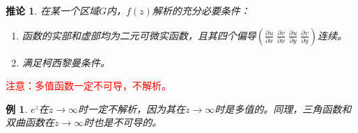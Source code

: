 \documentclass[10pt, a4paper, oneside]{ctexbook}
\newtheorem{corollary}[theorem]{推论}
\newtheorem{example}[theorem]{例}
\newcommand{\partdev}[3][]
{\ensuremath{\frac{\displaystyle \partial^{#1} #2}{ \displaystyle \partial #3}}}
\begin{document}
\begin{corollary}
    在某一个区域$G$内，$f(z)$解析的充分必要条件：
    \begin{enumerate}
        \item 函数的实部和虚部均为二元可微实函数，且其四个偏导$\left(\displaystyle \partdev{u}{x} \; \partdev{v}{x} \; \partdev{u}{y} \; \partdev{v}{y} \right)$连续。
        \item 满足柯西黎曼条件。
    \end{enumerate}
\end{corollary}
\textcolor{red}{注意：多值函数一定不可导，不解析。}
\begin{example}
    $e^z$在$z\to\infty$时一定不解析，因为其在$z\to\infty$时是多值的。同理，三角函数和双曲函数在$z\to\infty$时也是不可导的。
\end{example}
\end{document}
